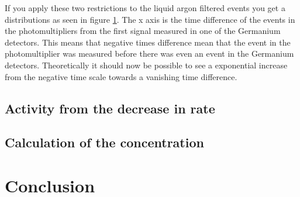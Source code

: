 If you apply these two restrictions to the liquid argon filtered events you get a distributions as seen in figure \ref{}.
The x axis is the time difference of the events in the photomultipliers from the first signal measured in one of the Germanium detectors.
This means that negative times difference mean that the event in the photomultiplier was measured before there was even an event in the Germanium detectors.
Theoretically it should now be possible to see a exponential increase from the negative time scale towards a vanishing time difference.
\\







\subsection{Activity from the decrease in rate}
\label{sec:SAfromDecrease}



\subsection{Calculation of the concentration}
\label{sec:calcOfTheCon}


\section{Conclusion}


































